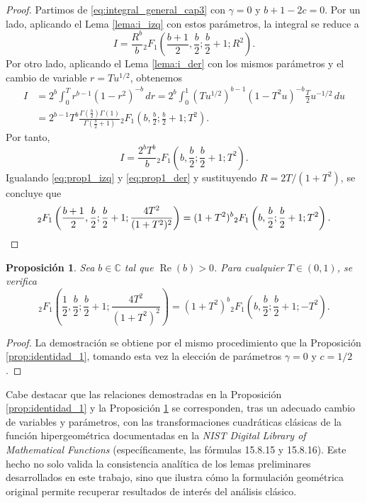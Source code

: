\documentclass[12pt,a4paper]{book}
\newtheorem{prop}[theorem]{Proposición}
\begin{document}
\begin{proof}
Partimos de \eqref{eq:integral_general_cap3} con $\gamma = 0$ y $b+1-2c = 0$. Por un lado, aplicando el Lema \ref{lema:i_izq} con estos parámetros, la integral se reduce a
\begin{equation}
\label{eq:prop1_izq}
    I = \frac{R^b}{b} {}_{2}F_{1}\left(\frac{b+1}{2}, \frac{b}{2}; \frac{b}{2}+1; R^2\right).
\end{equation}
Por otro lado, aplicando el Lema \ref{lema:i_der} con los mismos parámetros y el cambio de variable $r = T u^{1/2}$, obtenemos
\begin{align*}
    I &= 2^b \int_{0}^{T} r^{b-1} (1-r^2)^{-b} \, dr = 2^b \int_{0}^{1} \left(T u^{1/2}\right)^{b-1} (1-T^2 u)^{-b} \frac{T}{2} u^{-1/2} \, du \\
    &= 2^{b-1} T^b \frac{\Gamma\left(\frac{b}{2}\right)\Gamma(1)}{\Gamma\left(\frac{b}{2}+1\right)} {}_{2}F_{1}\left(b, \frac{b}{2}; \frac{b}{2}+1; T^2\right).
\end{align*}
Por tanto,
\begin{equation}
\label{eq:prop1_der}
    I = \frac{2^b T^b}{b} {}_{2}F_{1}\left(b,\frac{b}{2};\frac{b}{2} + 1; T^2\right).
\end{equation}
Igualando \eqref{eq:prop1_izq} y \eqref{eq:prop1_der} y sustituyendo $R = 2T/(1+T^2)$, se concluye que
\[
    {}_{2}F_{1}\left(\frac{b+1}{2}, \frac{b}{2}; \frac{b}{2}+1; \frac{4T^2}{(1+T^2)^2}\right) = (1+T^2)^b {}_{2}F_{1}\left(b, \frac{b}{2}; \frac{b}{2}+1; T^2\right).
    \qedhere
\]
\end{proof}

\begin{prop}
\label{prop:identidad_2}
Sea $b \in \mathbb{C}$ tal que $\operatorname{Re}(b) > 0$. Para cualquier $T \in (0, 1)$, se verifica
\[
    {}_{2}F_{1}\left(\frac{1}{2}, \frac{b}{2}; \frac{b}{2}+1; \frac{4T^2}{(1+T^2)^2}\right) = (1+T^2)^b {}_{2}F_{1}\left(b, \frac{b}{2}; \frac{b}{2}+1; -T^2\right).
\]
\end{prop}
\begin{proof}
La demostración se obtiene por el mismo procedimiento que la Proposición \ref{prop:identidad_1}, tomando esta vez la elección de parámetros $\gamma = 0$ y $c = 1/2$.
\end{proof}

Cabe destacar que las relaciones demostradas en la Proposición \ref{prop:identidad_1} y la Proposición \ref{prop:identidad_2} se corresponden, tras un adecuado cambio de variables y parámetros, con las transformaciones cuadráticas clásicas de la función hipergeométrica documentadas en la \textit{NIST Digital Library of Mathematical Functions} \cite{dlmf} (específicamente, las fórmulas 15.8.15 y 15.8.16). Este hecho no solo valida la consistencia analítica de los lemas preliminares desarrollados en este trabajo, sino que ilustra cómo la formulación geométrica original permite recuperar resultados de interés del análisis clásico.
\end{document}
